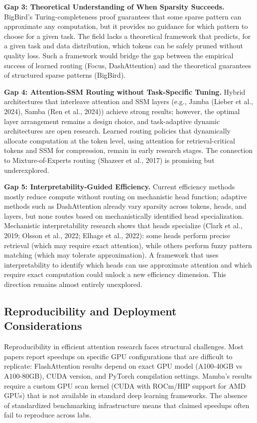 \documentclass[10pt,twocolumn]{article}
\begin{document}
\textbf{Gap 3: Theoretical Understanding of When Sparsity Succeeds.} BigBird's Turing-completeness proof guarantees that some sparse pattern can approximate any computation, but it provides no guidance for which pattern to choose for a given task. The field lacks a theoretical framework that predicts, for a given task and data distribution, which tokens can be safely pruned without quality loss. Such a framework would bridge the gap between the empirical success of learned routing (Focus, DashAttention) and the theoretical guarantees of structured sparse patterns (BigBird).

\textbf{Gap 4: Attention-SSM Routing without Task-Specific Tuning.} Hybrid architectures that interleave attention and SSM layers (e.g., Jamba (Lieber et al., 2024), Samba (Ren et al., 2024)) achieve strong results; however, the optimal layer arrangement remains a design choice, and task-adaptive dynamic architectures are open research. Learned routing policies that dynamically allocate computation at the token level, using attention for retrieval-critical tokens and SSM for compression, remain in early research stages. The connection to Mixture-of-Experts routing (Shazeer et al., 2017) is promising but underexplored.

\textbf{Gap 5: Interpretability-Guided Efficiency.} Current efficiency methods mostly reduce compute without routing on mechanistic head function; adaptive methods such as DashAttention already vary sparsity across tokens, heads, and layers, but none routes based on mechanistically identified head specialization. Mechanistic interpretability research shows that heads specialize (Clark et al., 2019; Olsson et al., 2022; Elhage et al., 2022): some heads perform precise retrieval (which may require exact attention), while others perform fuzzy pattern matching (which may tolerate approximation). A framework that uses interpretability to identify which heads can use approximate attention and which require exact computation could unlock a new efficiency dimension. This direction remains almost entirely unexplored.

\subsection{Reproducibility and Deployment Considerations}\label{reproducibility-and-deployment-considerations}

Reproducibility in efficient attention research faces structural challenges. Most papers report speedups on specific GPU configurations that are difficult to replicate: FlashAttention results depend on exact GPU model (A100-40GB vs A100-80GB), CUDA version, and PyTorch compilation settings. Mamba's results require a custom GPU scan kernel (CUDA with ROCm/HIP support for AMD GPUs) that is not available in standard deep learning frameworks. The absence of standardized benchmarking infrastructure means that claimed speedups often fail to reproduce across labs.
\end{document}
